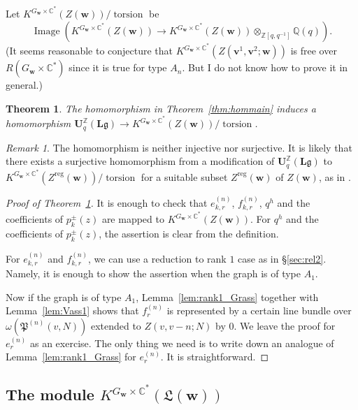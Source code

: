 \documentclass[12pt]{amsart}
\def\Bbb{\mathbb}
\def\frak{\mathfrak}
\newtheorem{Theorem}[equation]{Theorem}
\theoremstyle{definition}
\theoremstyle{remark}
\newtheorem{Remark}[equation]{Remark}
\numberwithin{equation}{subsection}
\newcommand{\thmref}[1]{Theorem~\ref{#1}}
\newcommand{\secref}[1]{\S\ref{#1}}
\newcommand{\lemref}[1]{Lemma~\ref{#1}}
\newcommand{\C}{{\Bbb C}}
\newcommand{\Z}{{\Bbb Z}}
\newcommand{\Q}{{\Bbb Q}}
\newcommand{\La}{{\frak L}} %
\newcommand{\bv}{{\mathbf v}} %
\newcommand{\bw}{{\mathbf w}} %
\newcommand{\Uli}{{\mathbf U}^{\Z}_q({\mathbf L}\mathfrak g)}
\newcommand{\Pa}{{\frak P}} %
\newcommand{\Zw}{Z(\bw)}
\newcommand{\Law}{\La(\bw)}
\begin{document}
\subsection{}
Let $K^{G_\bw\times\C^*}(\Zw)/\!\operatorname{torsion}$
be
\begin{equation*}
   \operatorname{Image}\left(K^{G_\bw\times\C^*}(\Zw)
     \to
   K^{G_\bw\times\C^*}(\Zw)\otimes_{\Z[q,q^{-1}]}\Q(q) 
   \right).
\end{equation*}
(It seems reasonable to conjecture that
$K^{G_\bw\times\C^*}(Z(\bv^1,\bv^2;\bw))$ is free over
$R(G_\bw\times\C^*)$ since it is true for type $A_n$.
But I do not know how to prove it in general.)

\begin{Theorem}\label{thm:homint}
The homomorphism in \thmref{thm:hommain} induces
a homomorphism $\Uli\to
K^{G_\bw\times\C^*}(\Zw)/\!\operatorname{torsion}$.
\end{Theorem}

\begin{Remark}
The homomorphism is neither injective nor surjective. It is likely
that there exists a surjective homomorphism from a modification of
$\Uli$ to
$K^{G_\bw\times\C^*}(Z^{\operatorname{reg}}(\bw))/\!\operatorname{torsion}$
for a suitable subset $Z^{\operatorname{reg}}(\bw)$ of $\Zw$,
as in \cite[9.5, 10.15]{Na-alg}.
\end{Remark}

\begin{proof}[Proof of \thmref{thm:homint}]
It is enough to check that
$e_{k,r}^{(n)}$, $f_{k,r}^{(n)}$, $q^h$
and the coefficients of $p_k^\pm(z)$ are mapped to
$K^{G_\bw\times\C^*}(\Zw)$.
For $q^h$ and the coefficients of $p_k^\pm(z)$, the assertion is clear 
from the definition.

For $e_{k,r}^{(n)}$ and $f_{k,r}^{(n)}$, we can use
a reduction to rank $1$ case as in \secref{sec:rel2}.
Namely, it is enough to show the assertion when the graph is of type
$A_1$.

Now if the graph is of type $A_1$, \lemref{lem:rank1_Grass}
together with \lemref{lem:Vass1}
shows that 
$f_{r}^{(n)}$ is represented by a certain line bundle over
$\omega(\Pa^{(n)}(v,N))$ extended to $Z(v,v-n;N)$ by $0$.
We leave the proof for $e_r^{(n)}$ as an exercise. The only thing we
need is to write down an analogue of \lemref{lem:rank1_Grass} for
$e_r^{(n)}$. It is straightforward.
\end{proof}

\subsection{The module $K^{G_\bw\times\C^*}(\Law)$}
\end{document}
